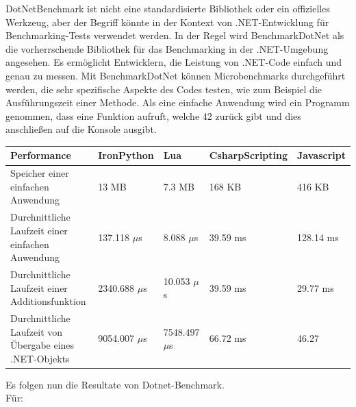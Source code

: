 DotNetBenchmark ist nicht eine standardisierte Bibliothek oder ein offizielles Werkzeug, aber der Begriff könnte in der Kontext von .NET-Entwicklung für Benchmarking-Tests verwendet werden. In der Regel wird BenchmarkDotNet als die vorherrschende Bibliothek für das Benchmarking in der .NET-Umgebung angesehen. Es ermöglicht Entwicklern, die Leistung von .NET-Code einfach und genau zu messen. 
Mit BenchmarkDotNet können Microbenchmarks durchgeführt werden, die sehr spezifische Aspekte des Codes testen, wie zum Beispiel die Ausführungszeit einer Methode.
Als eine einfache Anwendung wird ein Programm genommen, dass eine Funktion aufruft, welche 42 zurück gibt 
und dies anschließen auf die Konsole ausgibt.
\begin{table}[H]
    \begin{tabular}{|p{3cm}|p{3cm}|p{3cm}|p{3cm}|p{3cm}|}
        \hline
        Performance & IronPython & Lua & CsharpScripting & Javascript\\ \hline
        Speicher einer einfachen Anwendung & 13 MB & 7.3 MB & 168 KB & 416 KB  \\ \hline
        Durchnittliche Laufzeit einer einfachen Anwendung & 137.118 $\mu$s & 8.088 $\mu$s & 39.59 ms & 128.14 ms\\ \hline
        Durchnittliche Laufzeit einer Additionsfunktion & 2340.688 $\mu$s & 10.053 $\mu$s &39.59 ms &  29.77 ms \\ \hline
        Durchnittliche Laufzeit von Übergabe eines .NET-Objekts & 9054.007 $\mu$s & 7548.497 $\mu$s &  66.72 ms & 46.27  \\ \hline
    \end{tabular}
\end{table}

\newpage
Es folgen nun die Resultate von Dotnet-Benchmark. \\

Für:


